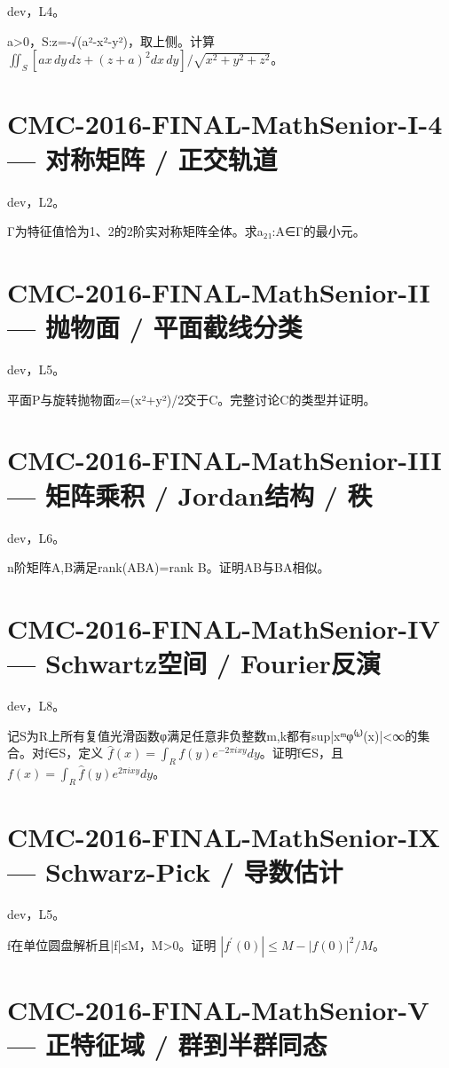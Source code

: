\documentclass[UTF8]{ctexart}
\begin{document}
dev，L4。

a>0，S:z=-√(a²-x²-y²)，取上侧。计算 $\iint_S[ax\,dy\,dz+(z+a)^2dx\,dy]/\sqrt{x^2+y^2+z^2}$。

\section*{CMC-2016-FINAL-MathSenior-I-4 — 对称矩阵 / 正交轨道}

dev，L2。

Γ为特征值恰为1、2的2阶实对称矩阵全体。求{a₂₁:A∈Γ}的最小元。

\section*{CMC-2016-FINAL-MathSenior-II — 抛物面 / 平面截线分类}

dev，L5。

平面P与旋转抛物面z=(x²+y²)/2交于C。完整讨论C的类型并证明。

\section*{CMC-2016-FINAL-MathSenior-III — 矩阵乘积 / Jordan结构 / 秩}

dev，L6。

n阶矩阵A,B满足rank(ABA)=rank B。证明AB与BA相似。

\section*{CMC-2016-FINAL-MathSenior-IV — Schwartz空间 / Fourier反演}

dev，L8。

记S为R上所有复值光滑函数φ满足任意非负整数m,k都有sup|xᵐφ⁽ᵏ⁾(x)|<∞的集合。对f∈S，定义 $\hat f(x)=\int_Rf(y)e^{-2\pi ixy}dy$。证明f̂∈S，且 $f(x)=\int_R\hat f(y)e^{2\pi ixy}dy$。

\section*{CMC-2016-FINAL-MathSenior-IX — Schwarz-Pick / 导数估计}

dev，L5。

f在单位圆盘解析且|f|≤M，M>0。证明 $|f^{\prime}(0)|\le M-|f(0)|^2/M$。

\section*{CMC-2016-FINAL-MathSenior-V — 正特征域 / 群到半群同态}
\end{document}
